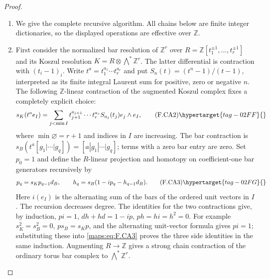 \begin{proof}
\begin{enumerate}[label={$\langle1\rangle$\arabic*.}]
\item We give the complete recursive algorithm.  All chains below are
finite integer dictionaries, so the displayed operations are
effective over $\mathbb Z$.

\item First consider the normalized bar resolution of $\mathbb Z^r$
over $R=\mathbb Z[t_1^{\pm1},\ldots,t_r^{\pm1}]$ and its Koszul
resolution $K=R\otimes\bigwedge^*\mathbb Z^r$.
The latter differential is contraction with $(t_i-1)_i$.
Write $t^a=t_1^{a_1}\cdots t_r^{a_r}$ and put
$S_n(t)=(t^n-1)/(t-1)$, interpreted as its finite integral
Laurent sum for positive, zero or negative $n$.
The following $\mathbb Z$-linear contraction of the augmented
Koszul complex fixes a completely explicit choice:
\[
 s_K(t^a e_I)=
 \sum_{j<\min I}
 t_{j+1}^{a_{j+1}}\cdots t_r^{a_r}S_{a_j}(t_j)
 e_j\wedge e_I,                                           \tag{F.CA2}\hypertarget{tag-02FF}{}\label{maps:eq:F.CA2}
\]
where $\min\varnothing=r+1$ and indices in $I$ are increasing.
The bar contraction is
$s_B(t^a[g_1|\cdots|g_q])=[a|g_1|\cdots|g_q]$; terms with a
zero bar entry are zero.  Set $p_0=1$ and define the
$R$-linear projection and homotopy on coefficient-one bar
generators recursively by
\[
 p_q=s_Kp_{q-1}d_B,
 \qquad
 h_q=s_B(1-ip_q-h_{q-1}d_B).                               \tag{F.CA3}\hypertarget{tag-02FG}{}\label{maps:eq:F.CA3}
\]
Here $i(e_I)$ is the alternating sum of the bars of the ordered
unit vectors in $I$.  The recursion decreases degree.  The
identities for the two contractions give, by induction,
$pi=1$, $dh+hd=1-ip$, $ph=hi=h^2=0$.
For example $s_K^2=s_B^2=0$, $ps_B=s_Kp$, and the alternating
unit-vector formula gives $pi=1$; substituting these into
\eqref{maps:eq:F.CA3} proves the three side identities in the same induction.
Augmenting $R\to\mathbb Z$ gives a strong chain contraction
of the ordinary torus bar complex to $\bigwedge^*\mathbb Z^r$.


\end{enumerate}
\end{proof}
